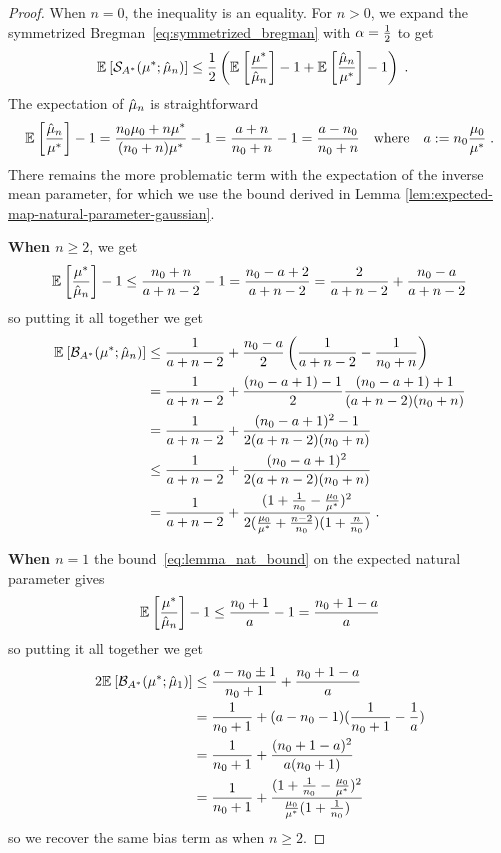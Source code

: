 \begin{proof}
When $n=0$, the inequality is an equality. 
For $n>0$, we expand the symmetrized Bregman~\eqref{eq:symmetrized_bregman} with $\alpha=\frac{1}{2}$ to get
\begin{align}
	\mathbb{E}_{} \left[ {\mathcal S}_{A^*}(\mu^*; \hat {\mu}_n) \right]  
	&\leq \frac{1}{2} \left(\mathbb{E}_{} \left[ \frac{\mu^*}{\hat {\mu}_n} \right]  -1  + \mathbb{E}_{} \left[ \frac{\hat {\mu}_n}{\mu^*} \right]  - 1\right) \; .
\end{align}
The expectation of $\hat {\mu}_n$ is straightforward
\begin{align}
	 \mathbb{E}_{} \left[ \frac{\hat {\mu}_n}{\mu^*} \right]  - 1 
	 = \frac{n_0 \mu_0 + n \mu^*}{(n_0+n)\mu^*} - 1 
	 = \frac{a+n}{n_0+n} - 1 = \frac{a - n_0}{n_0+n}
	 \quad \text{where} \quad
	 a:=n_0\frac{\mu_0}{\mu^*} \; .
\end{align}
There remains the more problematic term with the expectation of the inverse mean parameter, 
for which we use the bound derived in Lemma \ref{lem:expected-map-natural-parameter-gaussian}.

\textbf{When $n\geq 2$}, we get 
\begin{align}
	\mathbb{E}_{} \left[ \frac{\mu^*}{\hat {\mu}_n} \right]  - 1 
	\leq \frac{n_0 + n}{a +n - 2} -1
	= \frac{n_0 - a + 2}{a +n - 2}
	 = \frac{2}{a +n - 2} + \frac{n_0 - a}{a +n - 2}
\end{align}
so putting it all together we get 
\begin{align}
	\mathbb{E}_{} \left[ {\mathcal B}_{A^*}(\mu^*; \hat {\mu}_n) \right]  
	&\leq \frac{1}{a+n-2} + \frac{n_0-a}{2}  \left( \frac{1}{a+n-2} - \frac{1}{n_0+n} \right)\\
	&= \frac{1}{a+n-2} + \frac{(n_0-a + 1) - 1}{2}  \frac{(n_0 - a + 1) + 1}{(a+n-2)(n_0+n)} \\
	&= \frac{1}{a+n-2} + \frac{(n_0 - a +1)^2 - 1}{2(a+n-2)(n_0+n)} \\
	&\leq \frac{1}{a+n-2} + \frac{(n_0 - a +1)^2}{2(a+n-2)(n_0 + n)} \\
	&= \frac{1}{a+n-2} + \frac{(1 + \frac{1}{n_0} - \frac{\mu_0}{\mu^*})^2}{2 (\frac{\mu_0}{\mu^*}+\frac{n-2}{n_0})(1 + \frac{n}{n_0} )} \; .
\end{align}

\textbf{When $n=1$} the bound~\eqref{eq:lemma_nat_bound}  on the expected natural parameter gives
\begin{align}
	\mathbb{E}_{} \left[ \frac{\mu^*}{\hat {\mu}_n} \right]  - 1 
	\leq \frac{n_0 + 1}{a} -1
	= \frac{n_0 +1 - a}{a}
\end{align}
so putting it all together we get
\begin{align}
	2\mathbb{E}_{} \left[ {\mathcal B}_{A^*}(\mu^*; \hat \mu_1) \right]  
	&\leq \frac{a - n_0 \pm 1}{n_0 + 1}  + \frac{n_0 +1 - a }{a} \\
	& = \frac{1}{n_0+1}  + ( a - n_0 - 1)(\frac{1}{n_0+1} - \frac{1}{a}) \\
	& = \frac{1}{n_0+1}  + \frac{(n_0 + 1 -a)^2}{a(n_0+1)}\\
	&= \frac{1}{n_0+1}  + \frac{(1 + \frac{1}{n_0} - \frac{\mu_0}{\mu^*})^2}{\frac{\mu_0}{\mu^*}(1 + \frac{1}{n_0} )} 
\end{align}
so we  recover the same bias term as when $n\geq2$.
\end{proof}


